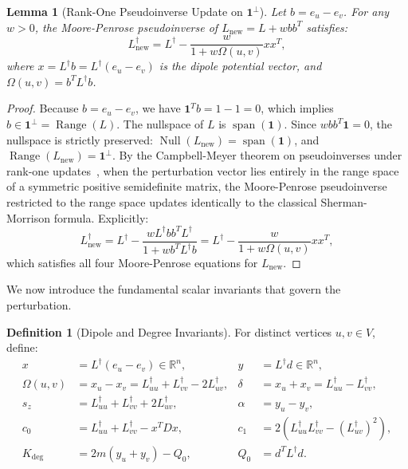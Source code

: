 \documentclass[11pt,a4paper]{article}
\theoremstyle{plain}
\newtheorem{lemma}[theorem]{Lemma}
\theoremstyle{definition}
\newtheorem{definition}[theorem]{Definition}
\begin{document}
\begin{lemma}[Rank-One Pseudoinverse Update on $\mathbf{1}^\perp$]
\label{lem:sherman_morrison_pinv}
Let $b = e_u - e_v$. For any $w > 0$, the Moore-Penrose pseudoinverse of $L_{\mathrm{new}} = L + w b b^T$ satisfies:
\begin{equation}
    L_{\mathrm{new}}^\dagger = L^\dagger - \frac{w}{1 + w \Omega(u, v)} x x^T,
\end{equation}
where $x = L^\dagger b = L^\dagger(e_u - e_v)$ is the dipole potential vector, and $\Omega(u, v) = b^T L^\dagger b$.
\end{lemma}

\begin{proof}
Because $b = e_u - e_v$, we have $\mathbf{1}^T b = 1 - 1 = 0$, which implies $b \in \mathbf{1}^\perp = \operatorname{Range}(L)$. The nullspace of $L$ is $\operatorname{span}(\mathbf{1})$. Since $w b b^T \mathbf{1} = 0$, the nullspace is strictly preserved: $\operatorname{Null}(L_{\mathrm{new}}) = \operatorname{span}(\mathbf{1})$, and $\operatorname{Range}(L_{\mathrm{new}}) = \mathbf{1}^\perp$. By the Campbell-Meyer theorem on pseudoinverses under rank-one updates~\cite{campbell1979generalized}, when the perturbation vector lies entirely in the range space of a symmetric positive semidefinite matrix, the Moore-Penrose pseudoinverse restricted to the range space updates identically to the classical Sherman-Morrison formula. Explicitly:
\begin{equation}
    L_{\mathrm{new}}^\dagger = L^\dagger - \frac{w L^\dagger b b^T L^\dagger}{1 + w b^T L^\dagger b} = L^\dagger - \frac{w}{1 + w \Omega(u, v)} x x^T,
\end{equation}
which satisfies all four Moore-Penrose equations for $L_{\mathrm{new}}$.
\end{proof}

We now introduce the fundamental scalar invariants that govern the perturbation.
\begin{definition}[Dipole and Degree Invariants]
\label{def:invariants}
For distinct vertices $u, v \in V$, define:
\begin{align}
    x &= L^\dagger(e_u - e_v) \in \mathbb{R}^n, & y &= L^\dagger d \in \mathbb{R}^n, \\
    \Omega(u, v) &= x_u - x_v = L^\dagger_{uu} + L^\dagger_{vv} - 2 L^\dagger_{uv}, & \delta &= x_u + x_v = L^\dagger_{uu} - L^\dagger_{vv}, \\
    s_z &= L^\dagger_{uu} + L^\dagger_{vv} + 2 L^\dagger_{uv}, & \alpha &= y_u - y_v, \\
    c_0 &= L^\dagger_{uu} + L^\dagger_{vv} - x^T D x, & c_1 &= 2 \left( L^\dagger_{uu} L^\dagger_{vv} - (L^\dagger_{uv})^2 \right), \\
    K_{\mathrm{deg}} &= 2m(y_u + y_v) - Q_0, & Q_0 &= d^T L^\dagger d.
\end{align}
\end{definition}
\end{document}

